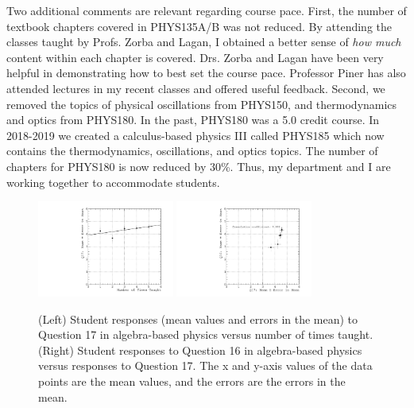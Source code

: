 \documentclass[../../main.tex]{subfiles}
\begin{document}
Two additional comments are relevant regarding course pace.  First, the number of textbook chapters covered in PHYS135A/B was not reduced.  By attending the classes taught by Profs. Zorba and Lagan, I obtained a better sense of \textit{how much} content within each chapter is covered.  Drs. Zorba and Lagan have been very helpful in demonstrating how to best set the course pace.  Professor Piner has also attended lectures in my recent classes and offered useful feedback.  Second, we removed the topics of physical oscillations from PHYS150, and thermodynamics and optics from PHYS180.  In the past, PHYS180 was a 5.0 credit course.  In 2018-2019 we created a calculus-based physics III called PHYS185 which now contains the thermodynamics, oscillations, and optics topics.  The number of chapters for PHYS180 is now reduced by 30\%.  Thus, my department and I are working together to accommodate students.  \\ \hspace{0.1cm}

\begin{figure}[h]
\centering
\includegraphics[width=0.4\textwidth]{Q17_algebra_based.pdf}
\includegraphics[width=0.4\textwidth]{Q16_Q17_algebra_based.pdf}
\caption{\label{fig:courses:intro_q17}  (Left) Student responses (mean values and errors in the mean) to Question 17 in algebra-based physics versus number of times taught. (Right) Student responses to Question 16 in algebra-based physics versus responses to Question 17.  The x and y-axis values of the data points are the mean values, and the errors are the errors in the mean.}
\end{figure}
\end{document}

